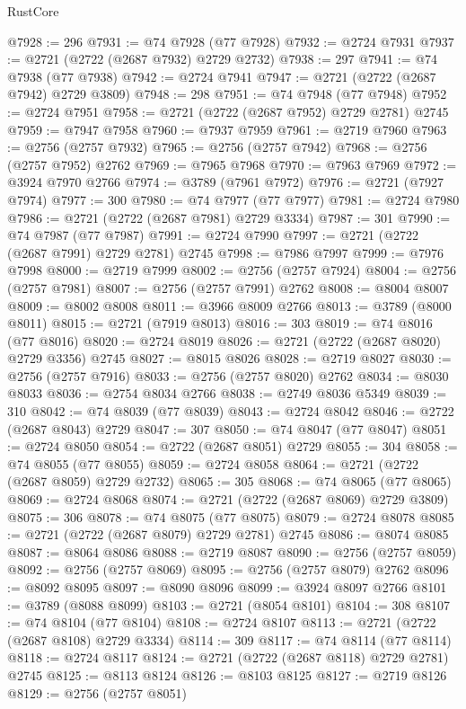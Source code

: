 \begin{lexlean}{RustCore}
\begin{coremodule}
@7928 := 296
@7931 := @74 @7928 (@77 @7928)
@7932 := @2724 @7931
@7937 := @2721 (@2722 (@2687 @7932) @2729 @2732)
@7938 := 297
@7941 := @74 @7938 (@77 @7938)
@7942 := @2724 @7941
@7947 := @2721 (@2722 (@2687 @7942) @2729 @3809)
@7948 := 298
@7951 := @74 @7948 (@77 @7948)
@7952 := @2724 @7951
@7958 := @2721 (@2722 (@2687 @7952) @2729 @2781) @2745
@7959 := @7947 @7958
@7960 := @7937 @7959
@7961 := @2719 @7960
@7963 := @2756 (@2757 @7932)
@7965 := @2756 (@2757 @7942)
@7968 := @2756 (@2757 @7952) @2762
@7969 := @7965 @7968
@7970 := @7963 @7969
@7972 := @3924 @7970 @2766
@7974 := @3789 (@7961 @7972)
@7976 := @2721 (@7927 @7974)
@7977 := 300
@7980 := @74 @7977 (@77 @7977)
@7981 := @2724 @7980
@7986 := @2721 (@2722 (@2687 @7981) @2729 @3334)
@7987 := 301
@7990 := @74 @7987 (@77 @7987)
@7991 := @2724 @7990
@7997 := @2721 (@2722 (@2687 @7991) @2729 @2781) @2745
@7998 := @7986 @7997
@7999 := @7976 @7998
@8000 := @2719 @7999
@8002 := @2756 (@2757 @7924)
@8004 := @2756 (@2757 @7981)
@8007 := @2756 (@2757 @7991) @2762
@8008 := @8004 @8007
@8009 := @8002 @8008
@8011 := @3966 @8009 @2766
@8013 := @3789 (@8000 @8011)
@8015 := @2721 (@7919 @8013)
@8016 := 303
@8019 := @74 @8016 (@77 @8016)
@8020 := @2724 @8019
@8026 := @2721 (@2722 (@2687 @8020) @2729 @3356) @2745
@8027 := @8015 @8026
@8028 := @2719 @8027
@8030 := @2756 (@2757 @7916)
@8033 := @2756 (@2757 @8020) @2762
@8034 := @8030 @8033
@8036 := @2754 @8034 @2766
@8038 := @2749 @8036 @5349
@8039 := 310
@8042 := @74 @8039 (@77 @8039)
@8043 := @2724 @8042
@8046 := @2722 (@2687 @8043) @2729
@8047 := 307
@8050 := @74 @8047 (@77 @8047)
@8051 := @2724 @8050
@8054 := @2722 (@2687 @8051) @2729
@8055 := 304
@8058 := @74 @8055 (@77 @8055)
@8059 := @2724 @8058
@8064 := @2721 (@2722 (@2687 @8059) @2729 @2732)
@8065 := 305
@8068 := @74 @8065 (@77 @8065)
@8069 := @2724 @8068
@8074 := @2721 (@2722 (@2687 @8069) @2729 @3809)
@8075 := 306
@8078 := @74 @8075 (@77 @8075)
@8079 := @2724 @8078
@8085 := @2721 (@2722 (@2687 @8079) @2729 @2781) @2745
@8086 := @8074 @8085
@8087 := @8064 @8086
@8088 := @2719 @8087
@8090 := @2756 (@2757 @8059)
@8092 := @2756 (@2757 @8069)
@8095 := @2756 (@2757 @8079) @2762
@8096 := @8092 @8095
@8097 := @8090 @8096
@8099 := @3924 @8097 @2766
@8101 := @3789 (@8088 @8099)
@8103 := @2721 (@8054 @8101)
@8104 := 308
@8107 := @74 @8104 (@77 @8104)
@8108 := @2724 @8107
@8113 := @2721 (@2722 (@2687 @8108) @2729 @3334)
@8114 := 309
@8117 := @74 @8114 (@77 @8114)
@8118 := @2724 @8117
@8124 := @2721 (@2722 (@2687 @8118) @2729 @2781) @2745
@8125 := @8113 @8124
@8126 := @8103 @8125
@8127 := @2719 @8126
@8129 := @2756 (@2757 @8051)

\end{coremodule}
\end{lexlean}
